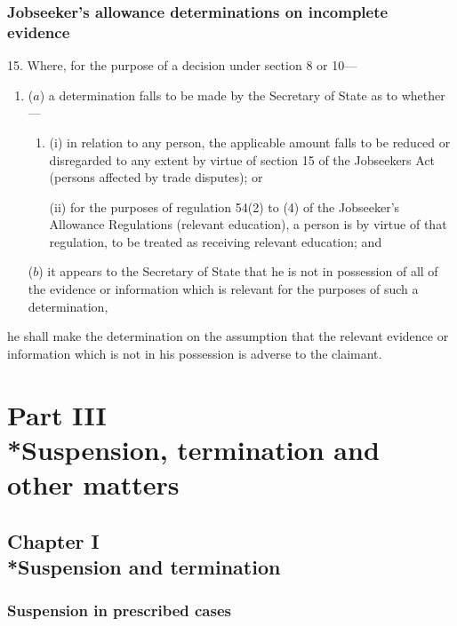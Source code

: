 \documentclass[12pt,a4paper]{article}
\begin{document}
\subsubsection[15. Jobseeker’s allowance determinations on incomplete evidence]{Jobseeker’s allowance determinations on incomplete evidence}

15.  Where, for the purpose of a decision under section 8 or 10—
\begin{enumerate}\item[]
($a$) a determination falls to be made by the Secretary of State as to whether—
\begin{enumerate}\item[]
(i) in relation to any person, the applicable amount falls to be reduced or disregarded to any extent by virtue of section 15 of the Jobseekers Act (persons affected by trade disputes); or

(ii) for the purposes of regulation 54(2) to (4) of the Jobseeker’s Allowance Regulations (relevant education), a person is by virtue of that regulation, to be treated as receiving relevant education; and
\end{enumerate}

($b$) it appears to the Secretary of State that he is not in possession of all of the evidence or information which is relevant for the purposes of such a determination,
\end{enumerate}
he shall make the determination on the assumption that the relevant evidence or information which is not in his possession is adverse to the claimant.

\section[Part III --- Suspension, termination and other matters]{Part III\\*Suspension, termination and other matters}

\subsection[Chapter I --- Suspension and termination]{Chapter I\\*Suspension and termination}

\subsubsection[16. Suspension in prescribed cases]{Suspension in prescribed cases}
\end{document}

